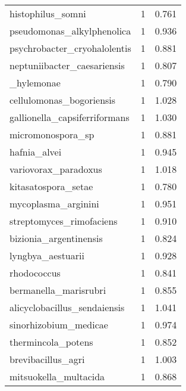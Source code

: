 \begin{tabular}{lrr}
                           histophilus\_somni &                   1 &     0.761 \\
                  pseudomonas\_alkylphenolica &                   1 &     0.936 \\
                psychrobacter\_cryohalolentis &                   1 &     0.881 \\
                 neptuniibacter\_caesariensis &                   1 &     0.807 \\
                     [clostridium]\_hylemonae &                   1 &     0.790 \\
                    cellulomonas\_bogoriensis &                   1 &     1.028 \\
               gallionella\_capsiferriformans &                   1 &     1.030 \\
                           micromonospora\_sp &                   1 &     0.881 \\
                                hafnia\_alvei &                   1 &     0.945 \\
                        variovorax\_paradoxus &                   1 &     1.018 \\
                         kitasatospora\_setae &                   1 &     0.780 \\
                         mycoplasma\_arginini &                   1 &     0.951 \\
                    streptomyces\_rimofaciens &                   1 &     0.910 \\
                      bizionia\_argentinensis &                   1 &     0.824 \\
                           lyngbya\_aestuarii &                   1 &     0.928 \\
                                 rhodococcus &                   1 &     0.841 \\
                       bermanella\_marisrubri &                   1 &     0.855 \\
                alicyclobacillus\_sendaiensis &                   1 &     1.041 \\
                       sinorhizobium\_medicae &                   1 &     0.974 \\
                          thermincola\_potens &                   1 &     0.852 \\
                          brevibacillus\_agri &                   1 &     1.003 \\
                       mitsuokella\_multacida &                   1 &     0.868 \\

\end{tabular}
